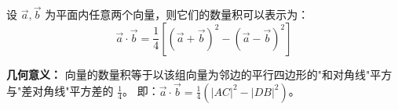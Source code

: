 \begin{statementbox}
设 $\vec{a}, \vec{b}$ 为平面内任意两个向量，则它们的数量积可以表示为：
\[ \vec{a} \cdot \vec{b} = \frac{1}{4} \left[ (\vec{a} + \vec{b})^2 - (\vec{a} - \vec{b})^2 \right] \]

\textbf{几何意义：}
向量的数量积等于以该组向量为邻边的平行四边形的"和对角线"平方与"差对角线"平方差的 $\frac{1}{4}$。
即：$\vec{a} \cdot \vec{b} = \frac{1}{4} \left( |AC|^2 - |DB|^2 \right)$。
\end{statementbox}